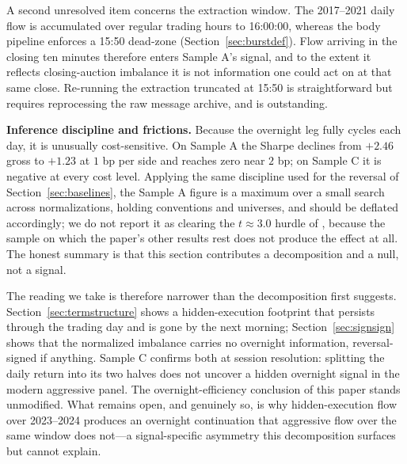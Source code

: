 \documentclass[11pt]{article}
\begin{document}
A second unresolved item concerns the extraction window. The 2017--2021 daily flow is accumulated over regular trading hours to 16:00:00, whereas the body pipeline enforces a 15:50 dead-zone (Section~\ref{sec:burstdef}). Flow arriving in the closing ten minutes therefore enters Sample A's signal, and to the extent it reflects closing-auction imbalance it is not information one could act on at that same close. Re-running the extraction truncated at 15:50 is straightforward but requires reprocessing the raw message archive, and is outstanding.

\textbf{Inference discipline and frictions.} Because the overnight leg fully cycles each day, it is unusually cost-sensitive. On Sample A the Sharpe declines from $+2.46$ gross to $+1.23$ at $1$ bp per side and reaches zero near $2$ bp; on Sample C it is negative at every cost level. Applying the same discipline used for the reversal of Section~\ref{sec:baselines}, the Sample A figure is a maximum over a small search across normalizations, holding conventions and universes, and should be deflated accordingly; we do not report it as clearing the $t\approx3.0$ hurdle of \citet{harvey2016}, because the sample on which the paper's other results rest does not produce the effect at all. The honest summary is that this section contributes a decomposition and a null, not a signal.

The reading we take is therefore narrower than the decomposition first suggests. Section~\ref{sec:termstructure} shows a hidden-execution footprint that persists through the trading day and is gone by the next morning; Section~\ref{sec:signsign} shows that the normalized imbalance carries no overnight information, reversal-signed if anything. Sample C confirms both at session resolution: splitting the daily return into its two halves does not uncover a hidden overnight signal in the modern aggressive panel. The overnight-efficiency conclusion of this paper stands unmodified. What remains open, and genuinely so, is why hidden-execution flow over 2023--2024 produces an overnight continuation that aggressive flow over the same window does not---a signal-specific asymmetry this decomposition surfaces but cannot explain.
\end{document}
